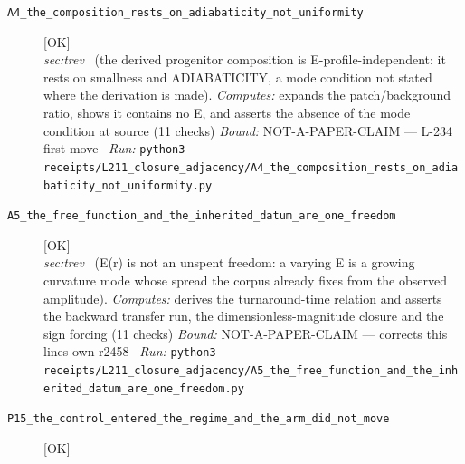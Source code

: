 \begin{description}
\item[\label{rcpt:A4_the_composition_rests_on_adiabaticity_not_uniformity}\texttt{A4\_the\_composition\_rests\_on\_adiabaticity\_not\_uniformity}]\hfill\textsf{[OK]}\\
\textit{sec:trev} \ (the derived progenitor composition is E-profile-independent: it rests on smallness and ADIABATICITY, a mode condition not stated where the derivation is made). 
\emph{Computes:} expands the patch/background ratio, shows it contains no E, and asserts the absence of the mode condition at source (11 checks)
 \emph{Bound:} NOT-A-PAPER-CLAIM --- L-234 first move
\ \emph{Run:} \texttt{python3 receipts/L211\_closure\_adjacency/A4\_the\_composition\_rests\_on\_adiabaticity\_not\_uniformity.py}
\item[\label{rcpt:A5_the_free_function_and_the_inherited_datum_are_one_freedom}\texttt{A5\_the\_free\_function\_and\_the\_inherited\_datum\_are\_one\_freedom}]\hfill\textsf{[OK]}\\
\textit{sec:trev} \ (E(r) is not an unspent freedom: a varying E is a growing curvature mode whose spread the corpus already fixes from the observed amplitude). 
\emph{Computes:} derives the turnaround-time relation and asserts the backward transfer run, the dimensionless-magnitude closure and the sign forcing (11 checks)
 \emph{Bound:} NOT-A-PAPER-CLAIM --- corrects this lines own r2458
\ \emph{Run:} \texttt{python3 receipts/L211\_closure\_adjacency/A5\_the\_free\_function\_and\_the\_inherited\_datum\_are\_one\_freedom.py}
\item[\label{rcpt:P15_the_control_entered_the_regime_and_the_arm_did_not_move}\texttt{P15\_the\_control\_entered\_the\_regime\_and\_the\_arm\_did\_not\_move}]\hfill\textsf{[OK]}\\

\end{description}
